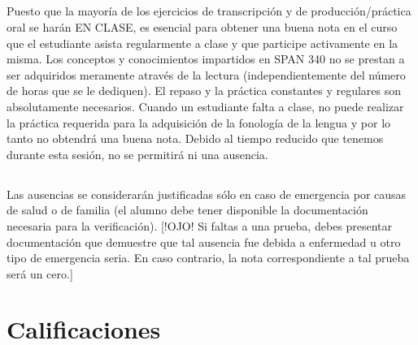 \documentclass[12pt]{article}
\begin{document}
\subsection{}
\begin{singlespace}
\noindent Puesto que la mayoría de los ejercicios de transcripción y de producción/práctica oral se harán EN CLASE, es esencial para obtener una buena nota en el curso que el estudiante asista regularmente a clase y que participe activamente en la misma. Los conceptos y conocimientos impartidos en SPAN 340 no se prestan a ser adquiridos meramente através de la lectura (independientemente del número de horas que se le dediquen). El repaso y la práctica constantes y regulares son absolutamente necesarios. Cuando un estudiante falta a clase, no puede realizar la práctica requerida para la adquisición de la fonología de la lengua y por lo tanto no obtendrá una buena nota. Debido al tiempo reducido que tenemos durante esta sesión, no se permitirá ni una ausencia.
\end{singlespace}

\subsection{}
\begin{singlespace}
\noindent Las ausencias se considerarán justificadas sólo en caso de emergencia por causas de salud o de familia (el alumno debe tener disponible la documentación necesaria para la verificación). [!OJO! Si faltas a una prueba, debes presentar documentación que demuestre que tal ausencia fue debida a enfermedad u otro tipo de emergencia seria. En caso contrario, la nota correspondiente a tal prueba será un cero.]
\end{singlespace}

\section{Calificaciones}
\vspace{.25in}
\end{document}
